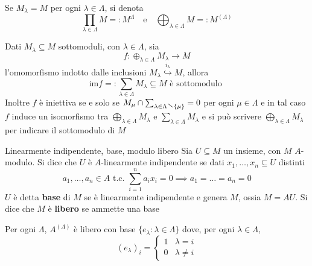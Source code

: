 \begin{note}[zione]
    Se \(M_\lambda = M\) per ogni \(\lambda \in \Lambda\), si denota
    \[
      \prod_{\lambda \in \Lambda} M =: M^{\Lambda} \quad \text{e} \quad
      \bigoplus_{\lambda \in \Lambda} M =: M^{{(\Lambda)}}
    \]
\end{note}

    Dati \(M_\lambda \subseteq M \) sottomoduli, con \(\lambda \in \Lambda
    \), sia \[f : \oplus_{\lambda \in \Lambda} M_\lambda \to M\] l'omomorfismo indotto
    dalle inclusioni \(M_\lambda \overset{i_{\lambda} }{\hookrightarrow }  M \), allora
    \[
      \mathrm{im}f =: \sum_{\lambda \in \Lambda} M_\lambda \subseteq M \text{ è sottomodulo } 
    \]
    Inoltre \(f\) è iniettiva se e solo se \(M_{\mu} \cap \sum_{\lambda \in \Lambda \sminus \{\mu\} } = 0  \) per ogni \(\mu \in \Lambda\) e in tal caso \(f\) induce un isomorfismo tra \(\bigoplus_{\lambda \in \Lambda} M_\lambda \) e \(\sum_{\lambda \in \Lambda} M_\lambda\) e si può scrivere \(\bigoplus_{\lambda \in \Lambda} M_\lambda\) per indicare il sottomodulo di \(M\) 


\begin{definition}{Linearmente indipendente, base, modulo libero}
    Sia \(U \subseteq M \) un insieme, con \(M\) \(A\)-modulo. Si dice che \(U\) è \(A\)-linearmente indipendente se dati \(x_{1},\dots,x_{n} \subseteq U \) distinti 
    \[
      a_{1}, \dots, a_{n} \in A \text{ t.c. } \sum_{i=1}^{n} a_{i} x_{i} = 0 \implies a_{1} = \dots = a_{n} = 0 
    \]
    \(U\) è detta \textbf{base} di \(M\) se è linearmente indipendente e genera
    \(M\), ossia \(M = AU\). Si dice che \(M\) è \textbf{libero} se ammette una
    base
\end{definition}

\begin{example}{}
    Per ogni \(\Lambda\), \(A^{{(\Lambda)}}\) è libero con base \(\{e_\lambda : \lambda \in  \Lambda\} \) dove, per ogni \(\lambda \in \Lambda\),
    \[
        (e_\lambda)_i = \begin{cases}{}
            1 & \lambda = i \\
            0 & \lambda \neq i
        \end{cases}
    \]
\end{example}

